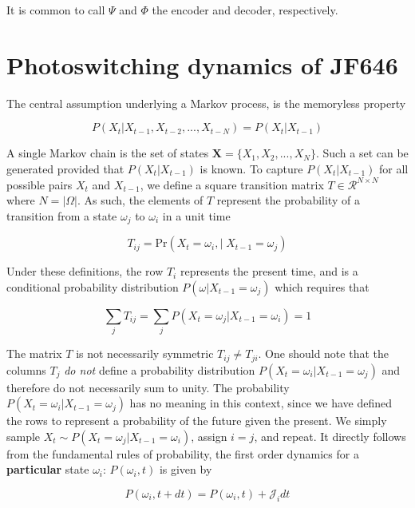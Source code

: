 \documentclass{ucetd}
\begin{document}
It is common to call $\Psi$ and $\Phi$ the encoder and decoder, respectively.

\section{Photoswitching dynamics of JF646}

The central assumption underlying a Markov process, is the memoryless property

\begin{equation*}
P(X_{t}|X_{t-1}, X_{t-2}, ..., X_{t-N}) = P(X_{t}|X_{t-1})
\end{equation*}

A single Markov chain is the set of states $\bm{X} = \{X_{1},X_{2},...,X_{N}\}$. Such a set can be generated provided that $P(X_{t}|X_{t-1})$ is known. To capture $P(X_{t}|X_{t-1})$ for all possible pairs $X_{t}$ and $X_{t-1}$, we define a square transition matrix $T\in \mathcal{R}^{N\times N}$ where $N = |\Omega|$. As such, the elements of $T$ represent the probability of a transition from a state $\omega_{j}$ to $\omega_{i}$ in a unit time

\begin{equation*}
T_{ij} = \mathrm{Pr}\left(X_{t}=\omega_{i}, | \;X_{t-1}=\omega_{j}\right)
\end{equation*}

Under these definitions, the row $T_{i}$ represents the present time, and is a conditional  probability distribution $P(\omega | X_{t-1} = \omega_{j})$ which requires that

\begin{equation*}
\sum_{j}T_{ij} = \sum_{j} P(X_{t} = \omega_{j} | X_{t-1} = \omega_{i}) = 1
\end{equation*}

The matrix $T$ is not necessarily symmetric $T_{ij} \neq T_{ji}$. One should note that the columns $T_{j}$ \emph{do not} define a probability distribution $P(X_{t} = \omega_{i} | X_{t-1} = \omega_{j})$ and therefore do not necessarily sum to unity. The probability $P(X_{t} = \omega_{i} | X_{t-1} = \omega_{j})$ has no meaning in this context, since we have defined the rows to represent a probability of the future given the present. We simply sample $X_{t} \sim P(X_{t} = \omega_{j} | X_{t-1} = \omega_{i})$, assign $i=j$, and repeat. It directly follows from the fundamental rules of probability, the first order dynamics for a \textbf{particular} state $\omega_{i}$: $P(\omega_{i},t)$ is given by

\begin{equation}
P(\omega_{i},t+dt) = P(\omega_{i},t) + \mathcal{J}_{i}dt
\end{equation}
\end{document}
